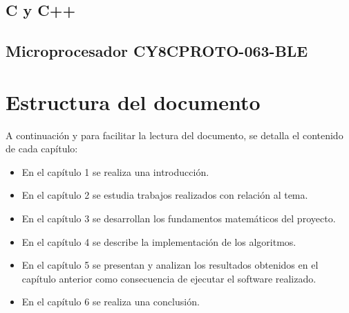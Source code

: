 \subsection{C \cite{ISO_C} y C++ \cite{ISO_CPP}}

\subsection{Microprocesador CY8CPROTO-063-BLE \cite{CY8CPROTO063BLE}}

\section{Estructura del documento}
A continuación y para facilitar la lectura del documento, se detalla el contenido de cada capítulo:

\begin{itemize}
	\item En el capítulo 1 se realiza una introducción.
	\item En el capítulo 2 se estudia trabajos realizados con relación al tema.
	\item En el capítulo 3 se desarrollan los fundamentos matemáticos del proyecto.
	\item En el capítulo 4 se describe la implementación de los algoritmos.
	\item En el capítulo 5 se presentan y analizan los resultados obtenidos en el capítulo anterior como consecuencia de ejecutar el software realizado. 
	\item En el capítulo 6  se realiza una conclusión.
\end{itemize}